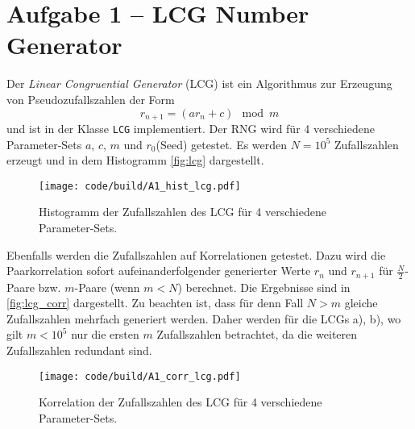 \section{Aufgabe 1 – LCG Number Generator}
\label{sec:A1}

Der \emph{Linear Congruential Generator} (LCG) ist ein Algorithmus zur Erzeugung von Pseudozufallszahlen der Form
\begin{equation}
  \label{eq:lcg}
  r_{n+1} = (a r_n + c) \mod m
\end{equation}
und ist in der Klasse \texttt{LCG} implementiert.
Der RNG wird für 4 verschiedene Parameter-Sets $a$, $c$, $m$ und $r_0$(Seed) getestet.
Es werden $N = 10^5$ Zufallszahlen erzeugt und in dem Histogramm \autoref{fig:lcg} dargestellt.
\begin{figure}
    \centering
    \texttt{[image: code/build/A1\_hist\_lcg.pdf]}
    \caption{Histogramm der Zufallszahlen des LCG für 4 verschiedene Parameter-Sets.}
    \label{fig:lcg}
\end{figure}

Ebenfalls werden die Zufallszahlen auf Korrelationen getestet.
Dazu wird die Paarkorrelation sofort aufeinanderfolgender generierter Werte $r_n$ und $r_{n+1}$ für $\frac{N}{2}$-Paare bzw. $m$-Paare (wenn $m<N$) berechnet.
Die Ergebnisse sind in \autoref{fig:lcg_corr} dargestellt.
Zu beachten ist, dass für denn Fall $N>m$ gleiche Zufallszahlen mehrfach generiert werden.
Daher werden für die LCGs a), b), wo gilt $m<10^5$ nur die ersten $m$ Zufallszahlen betrachtet, da die weiteren Zufallszahlen redundant sind.
\begin{figure}
    \centering
    \texttt{[image: code/build/A1\_corr\_lcg.pdf]}
    \caption{Korrelation der Zufallszahlen des LCG für 4 verschiedene Parameter-Sets.}
    \label{fig:lcg_corr}
\end{figure}